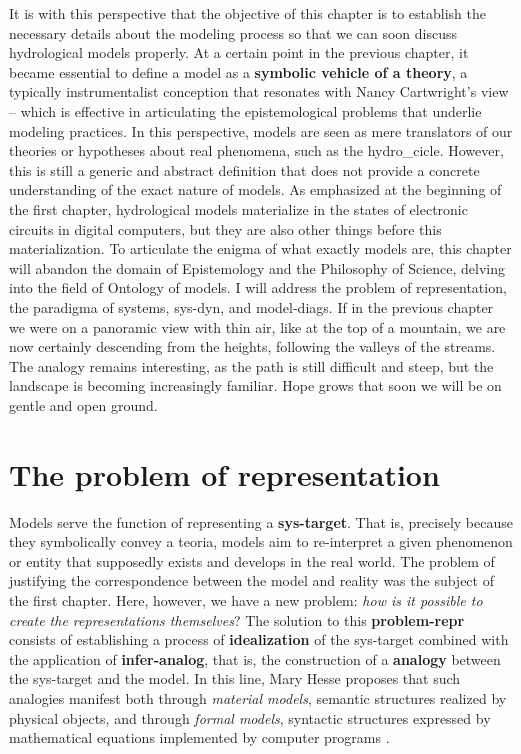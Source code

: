 \documentclass[./main_en.tex]{subfiles}
\begin{document}
\par It is with this perspective that the objective of this chapter is to establish the necessary details about the modeling process so that we can soon discuss hydrological models properly. At a certain point in the previous chapter, it became essential to define a \gls{model} as a \textbf{symbolic vehicle of a theory}, a typically instrumentalist conception that resonates with Nancy Cartwright's view \cite{nancy1983} -- which is effective in articulating the epistemological problems that underlie modeling practices. In this perspective, models are seen as mere translators of our theories or hypotheses about real phenomena, such as the \gls{hydro_cicle}. However, this is still a generic and abstract definition that does not provide a concrete understanding of the exact nature of models. As emphasized at the beginning of the first chapter, hydrological models materialize in the states of electronic circuits in digital computers, but they are also other things before this materialization. To articulate the enigma of what exactly models are, this chapter will abandon the domain of Epistemology and the Philosophy of Science, delving into the field of Ontology of models. I will address the problem of representation, the \gls{paradigma} of systems, \gls{sys-dyn}, and \gls{model-diags}. If in the previous chapter we were on a panoramic view with thin air, like at the top of a mountain, we are now certainly descending from the heights, following the valleys of the streams. The \gls{analogy} remains interesting, as the path is still difficult and steep, but the landscape is becoming increasingly familiar. Hope grows that soon we will be on gentle and open ground.

\section{The problem of representation} \label{sec:sys:represent}

\par Models serve the function of representing a \textbf{\gls{sys-target}}. That is, precisely because they symbolically convey a \gls{teoria}, models aim to re-interpret a given phenomenon or entity that supposedly exists and develops in the real world. The problem of justifying the correspondence between the \gls{model} and reality was the subject of the first chapter. Here, however, we have a new problem: \textit{how is it possible to create the representations themselves}? The solution to this \textbf{\gls{problem-repr}} consists of establishing a process of \textbf{\gls{idealization}} of the \gls{sys-target} combined with the application of \textbf{\gls{infer-analog}}, that is, the construction of a \textbf{\gls{analogy}} between the \gls{sys-target} and the \gls{model}. In this line, Mary Hesse proposes that such analogies manifest both through \textit{material models}, semantic structures realized by physical objects, and through \textit{formal models}, syntactic structures expressed by mathematical equations implemented by computer programs \cite{hesse2017}.
\end{document}
